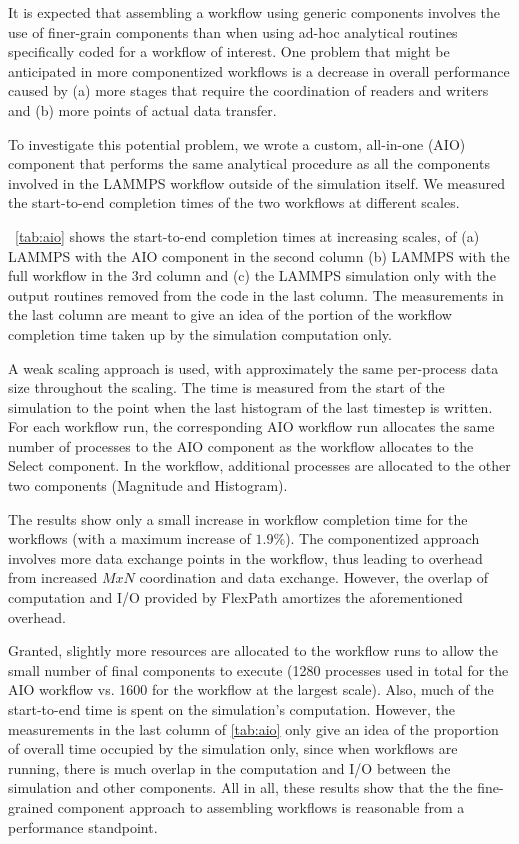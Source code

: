 It is expected that assembling a workflow
using generic components involves the use
of finer-grain components
than when using ad-hoc analytical routines
specifically coded
for a workflow of interest.
One problem that might be anticipated
in more componentized workflows
is a decrease in overall performance caused by
(a) more stages that require the coordination
of readers and writers
and (b) more points of actual data transfer.

To investigate this potential problem,
we wrote a custom, all-in-one (AIO) component
that performs the same analytical procedure
as all the components involved in the LAMMPS workflow
outside of the simulation itself.
We measured the start-to-end completion times of the two workflows 
at different scales.

~\autoref{tab:aio} shows the start-to-end
completion times
at increasing scales, of
(a) LAMMPS with the AIO component
in the second column
(b) LAMMPS with the full \sys workflow in the 3rd column
and (c) the LAMMPS simulation only with the output routines
removed from the code in the last column.
The measurements in the last column
are meant to give an idea of the portion
of the workflow completion time taken up by the simulation
computation only.

A weak scaling approach
is used, with approximately the same
per-process data size throughout the scaling.
The time is measured from the start of the simulation
to the point when the last histogram of
the last timestep is written.
For each \sys workflow run, the corresponding
AIO workflow run allocates the same
number of processes to the AIO component
as the \sys workflow allocates to the Select component.
In the \sys workflow, additional processes
are allocated to the other two components
(Magnitude and Histogram).

The results show only a small increase in
workflow completion time for the \sys
workflows (with a maximum increase of $1.9 \%$).
The componentized
approach involves more data exchange points
in the workflow, thus leading to
overhead from increased $MxN$ coordination and data exchange.
However, the overlap of computation and I/O provided by FlexPath
amortizes the aforementioned overhead.

Granted, slightly more resources are allocated to the
\sys workflow runs to allow the small number
of final components to execute (1280 processes
used in total for the AIO workflow vs. 1600 for
the \sys workflow at the largest scale).
Also, much of the start-to-end time is spent on
the simulation's computation.
However, the measurements in the last column
of \autoref{tab:aio}
only give an idea of the proportion of 
overall time occupied by the simulation only,
since when workflows are running, there is much
overlap in the computation and I/O between the
simulation and other components. All in all,
these results show that the 
the fine-grained component approach
to assembling workflows
is reasonable from a performance standpoint.

